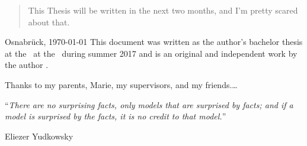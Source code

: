 \documentclass[11pt, oneside, english, singlespacing, %
headsepline, %
]{MastersDoctoralThesis}
\begin{document}
	
	\begin{abstract}
		\addchaptertocentry{\abstractname} %
		This Thesis will be written in the next two months, and I'm pretty scared about that.
	\end{abstract}


	\begin{preface}{\authorname}{Osnabrück, \today}
		\addchaptertocentry{\prefacename}
		\noindent This document was written as the author’s bachelor thesis at the \deptname~at the \univname~during summer 2017 and is an original and independent work by the author \authorname.
	\end{preface}



	
	
	\begin{acknowledgements}
		\addchaptertocentry{\acknowledgementname} %
		Thanks to my parents, Marie, my supervisors, and my friends.\ldots
	\end{acknowledgements}
	
	
	
	\newpage
	\vspace*{0.2\textheight}
	
	\noindent\enquote{\itshape There are no surprising facts, only models that are surprised by facts; and if a model is surprised by the facts, it is no credit to that model.}\bigbreak
	
	\hfill Eliezer Yudkowsky


	
\end{document}
